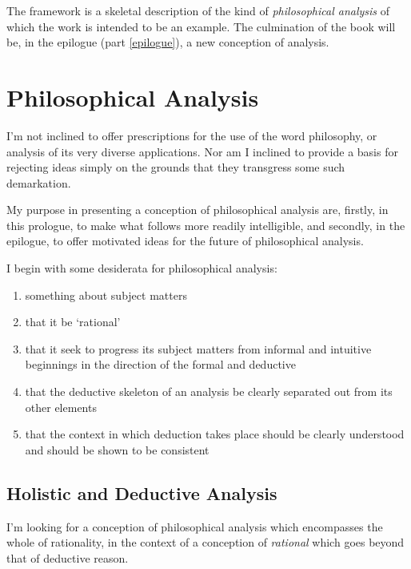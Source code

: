 The framework is a skeletal description of the kind of \emph{philosophical analysis} of which the work is intended to be an example.
The culmination of the book will be, in the epilogue (part \ref{epilogue}), a new conception of analysis.

\chapter{Philosophical Analysis}

I'm not inclined to offer prescriptions for the use of the word philosophy, or analysis of its very diverse applications.
Nor am I inclined to provide a basis for rejecting ideas simply on the grounds that they transgress some such demarkation.

My purpose in presenting a conception of philosophical analysis are, firstly, in this prologue, to make what follows more readily intelligible, and secondly, in the epilogue, to offer motivated ideas for the future of philosophical analysis.

I begin with some desiderata for philosophical analysis:

\begin{enumerate}
\item something about subject matters
\item that it be `rational'
\item that it seek to progress its subject matters from informal and intuitive beginnings in the direction of the formal and deductive
\item that the deductive skeleton of an analysis be clearly separated out from its other elements
\item that the context in which deduction takes place should be clearly understood and should be shown to be consistent
\end{enumerate}

\section{Holistic and Deductive Analysis}


I'm looking for a conception of philosophical analysis which encompasses the whole of rationality, in the context of a conception of \emph{rational} which goes beyond that of deductive reason.

